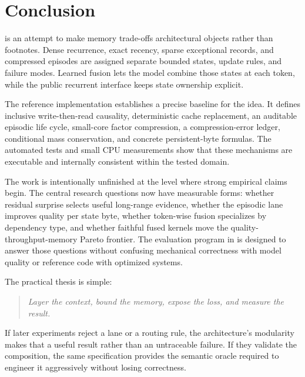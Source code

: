 \section{Conclusion}
\label{sec:conclusion}

\ALUCLU is an attempt to make memory trade-offs architectural objects rather
than footnotes. Dense recurrence, exact recency, sparse exceptional records,
and compressed episodes are assigned separate bounded states, update rules,
and failure modes. Learned fusion lets the model combine those states at each
token, while the public recurrent interface keeps state ownership explicit.

The reference implementation establishes a precise baseline for the idea. It
defines inclusive write-then-read causality, deterministic cache replacement,
an auditable episodic life cycle, small-core factor compression, a
compression-error ledger, conditional mass conservation, and concrete
persistent-byte formulas. The automated tests and small CPU measurements show
that these mechanisms are executable and internally consistent within the
tested domain.

The work is intentionally unfinished at the level where strong empirical
claims begin. The central research questions now have measurable forms:
whether residual surprise selects useful long-range evidence, whether the
episodic lane improves quality per state byte, whether token-wise fusion
specializes by dependency type, and whether faithful fused kernels move the
quality-throughput-memory Pareto frontier. The evaluation program in
 is designed to answer those questions without confusing
mechanical correctness with model quality or reference code with optimized
systems.

The practical thesis is simple:
\begin{quote}
\centering
\emph{Layer the context, bound the memory, expose the loss, and measure the
result.}
\end{quote}
If later experiments reject a lane or a routing rule, the architecture's
modularity makes that a useful result rather than an untraceable failure. If
they validate the composition, the same specification provides the semantic
oracle required to engineer it aggressively without losing correctness.
